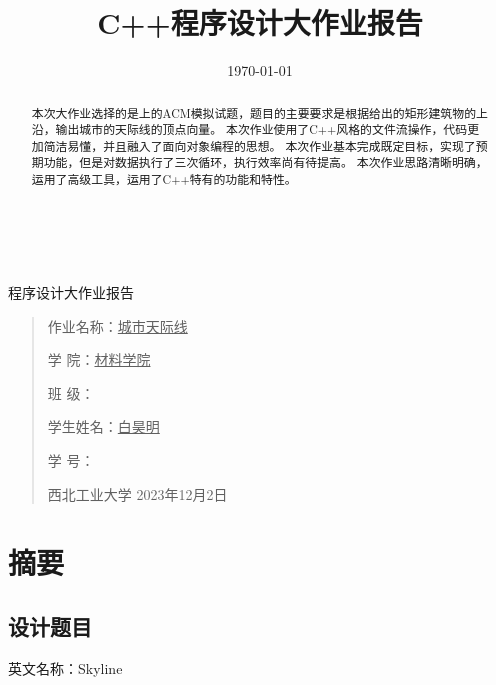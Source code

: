 \documentclass[a4paper]{ctexart}
\title{C++程序设计大作业报告}
\date{\today}
\begin{document}
        \thispagestyle{empty}
    	\begin{figure}[t]
		\parbox[b]{2cm}{
			}
		\parbox[b]{9cm}{
			\begin{center}

			\end{center}
			}
	\end{figure}

	\begin{center}
		\quad \\
		\quad \\
		\heiti \fontsize{25}{17} 程\quad 序\quad 设\quad 计\quad 大\quad 作\quad 业\quad 报\quad 告
		\vskip 2.5cm
		\heiti \zihao{2} 	
	\end{center}
	\vskip 2.5cm

	\begin{quotation}
		\songti \fontsize{15}{15}
		\doublespacing
		\par\setlength\parindent{12em}
		\quad 

        作业名称：\underline{\quad 城市天际线\quad}


		学\hspace{0.61cm} 院：\underline{\quad 材料学院\qquad}
        
        班\hspace{0.61cm} 级：\underline{\quad}

		学生姓名：\underline{\qquad 白昊明\qquad }

		学\hspace{0.61cm} 号：\underline{\quad}

		\vskip 2cm
        \centering
		西北工业大学
		\vskip 0cm
		\centering
		2023年12月2日
	\end{quotation}
    \textbf{}
    \begin{abstract}
        本次大作业选择的是上的ACM模拟试题，题目的主要要求是根据给出的矩形建筑物的上沿，输出城市的天际线的顶点向量。
		本次作业使用了C++风格的文件流操作，代码更加简洁易懂，并且融入了面向对象编程的思想。
		本次作业基本完成既定目标，实现了预期功能，但是对数据执行了三次循环，执行效率尚有待提高。
		本次作业思路清晰明确，运用了高级工具，运用了C++特有的功能和特性。
    \end{abstract}
    \newpage

	\tableofcontents
	\newpage
	\section{摘要}
	\subsection{设计题目}
	英文名称：Skyline
\end{document}
